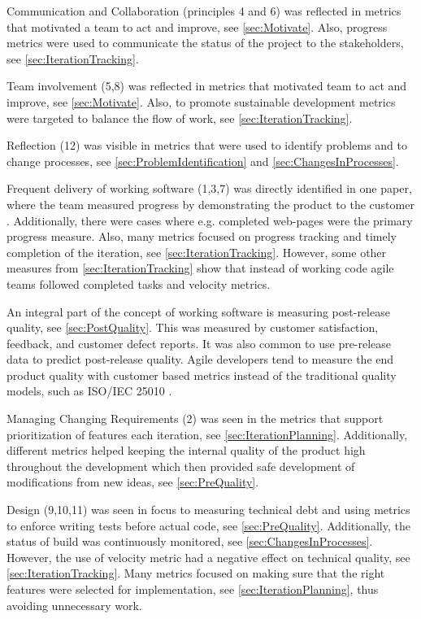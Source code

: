\documentclass{sig-alternate}
\newcommand{\eetu}[1]{\ignorespaces}
\newcommand{\juha}[1]{\ignorespaces}
\begin{document}
Communication and Collaboration (principles 4 and 6) was reflected in metrics
that motivated a team to act and improve, see \cref{sec:Motivate}. Also,
progress metrics were used to communicate the status of the project to the
stakeholders, see \cref{sec:IterationTracking}.

Team involvement (5,8) was reflected in metrics that motivated team to act and
improve, see \cref{sec:Motivate}. Also, to promote sustainable development
metrics were targeted to balance the flow of work, see
\cref{sec:IterationTracking}.

Reflection (12) was visible in metrics that were used to identify problems and
to change processes, see \cref{sec:ProblemIdentification} and
\cref{sec:ChangesInProcesses}.

Frequent delivery of working software (1,3,7) was directly identified in one
paper, where the team measured progress by demonstrating the product to the
customer \cite{Trimble20134826}. Additionally, there were cases where e.g.
completed web-pages \cite{Hong2010310} were the primary progress measure. Also, many metrics focused on progress tracking and timely completion
of the iteration, see \cref{sec:IterationTracking}. However, some other
measures from \cref{sec:IterationTracking} show that instead of working code
agile teams followed completed tasks and velocity metrics. 

An integral part of the concept of working software is measuring post-release
quality, see  \cref{sec:PostQuality}. This was measured by customer
satisfaction, feedback, and customer defect reports. It was also common to use
pre-release data to predict post-release quality. Agile developers tend to
measure the end product quality with customer based metrics instead of the
traditional quality models, such as ISO/IEC 25010 \cite{10951538}.

Managing Changing Requirements (2) was seen in the metrics that support
prioritization of features each iteration, see \cref{sec:IterationPlanning}.
Additionally, different metrics helped keeping the internal quality of the
product high throughout the development which then provided safe development
of modifications from new ideas, see \cref{sec:PreQuality}.

Design (9,10,11) was seen in focus to measuring technical debt and using
metrics to enforce writing tests before actual code, see
\cref{sec:PreQuality}. Additionally, the status of build was continuously
monitored, see \cref{sec:ChangesInProcesses}. However, the use of velocity
metric had a negative effect on technical quality, see
\cref{sec:IterationTracking}.
Many metrics focused on making sure that the right features were selected for
implementation, see \cref{sec:IterationPlanning}, thus avoiding unnecessary
work.
\end{document}
